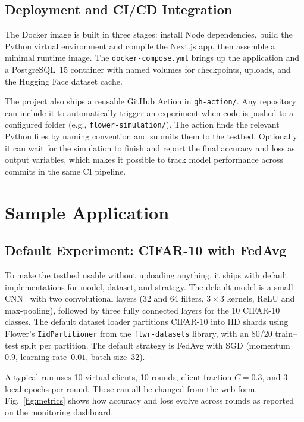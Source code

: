 \documentclass[conference]{IEEEtran}
\begin{document}
\subsection{Deployment and CI/CD Integration}

The Docker image is built in three stages: install Node dependencies,
build the Python virtual environment and compile the Next.js app,
then assemble a minimal runtime image.
The \texttt{docker-compose.yml} brings up the application and a
PostgreSQL~15 container with named volumes for checkpoints, uploads,
and the Hugging Face dataset cache.

The project also ships a reusable GitHub Action in \texttt{gh-action/}.
Any repository can include it to automatically trigger an experiment
when code is pushed to a configured folder (e.g.,
\texttt{flower-simulation/}).
The action finds the relevant Python files by naming convention and
submits them to the testbed.
Optionally it can wait for the simulation to finish and report the
final accuracy and loss as output variables, which makes it possible
to track model performance across commits in the same CI pipeline.

\section{Sample Application}
\label{sec:sample}

\subsection{Default Experiment: CIFAR-10 with FedAvg}

To make the testbed usable without uploading anything, it ships with
default implementations for model, dataset, and strategy.
The default model is a small CNN~\cite{paszke2019pytorch} with two
convolutional layers (32 and 64 filters, $3\times3$ kernels, ReLU
and max-pooling), followed by three fully connected layers for the
10 CIFAR-10 classes.
The default dataset loader partitions CIFAR-10 into IID shards using
Flower's \texttt{IidPartitioner} from the \texttt{flwr-datasets}
library, with an 80/20 train--test split per partition.
The default strategy is FedAvg with SGD (momentum~$0.9$, learning
rate~$0.01$, batch size~$32$).

A typical run uses 10 virtual clients, 10 rounds, client fraction
$C = 0.3$, and 3 local epochs per round.
These can all be changed from the web form.
Fig.~\ref{fig:metrics} shows how accuracy and loss evolve across
rounds as reported on the monitoring dashboard.
\end{document}

